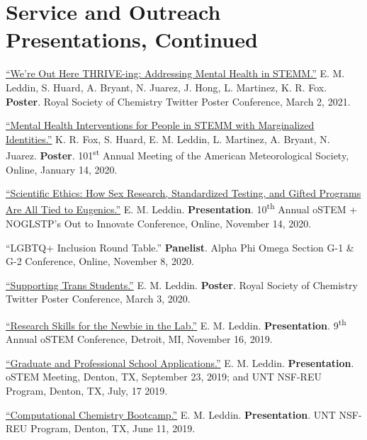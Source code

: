 \documentclass[letterpaper,11pt]{article}
\begin{document}
\section{Service and Outreach Presentations, Continued}
\begin{etaremune}[start=12]

  \item \textnormal{\href{https://twitter.com/ThriveLifeline/status/1366720589130592259?s=20}{``We're Out Here THRIVE-ing: Addressing Mental Health in STEMM.''} E. M. Leddin, S. Huard, A. Bryant, N. Juarez, J. Hong, L. Martinez, K. R. Fox. \textbf{Poster}. Royal Society of Chemistry Twitter Poster Conference, March 2, 2021.}
  \item \textnormal{\href{https://bit.ly/2020-oSTEM-Ethics}{``Mental Health Interventions for People in STEMM with Marginalized Identities.''} K. R. Fox, S. Huard, E. M. Leddin, L. Martinez, A. Bryant, N. Juarez. \textbf{Poster}. 101\textsuperscript{st} Annual Meeting of the American Meteorological Society, Online, January 14, 2020.}
  \item \textnormal{\href{https://bit.ly/2020-oSTEM-Ethics}{``Scientific Ethics: How Sex Research, Standardized Testing, and Gifted Programs Are All Tied to Eugenics.''} E. M. Leddin. \textbf{Presentation}. 10\textsuperscript{th} Annual oSTEM + NOGLSTP's Out to Innovate\texttrademark{} Conference, Online, November 14, 2020.}
  \item \textnormal{``LGBTQ+ Inclusion Round Table.'' \textbf{Panelist}. Alpha Phi Omega Section G-1 \& G-2 Conference, Online, November 8, 2020.}
  \item \textnormal{\href{https://twitter.com/EmLedd1/status/1234812260515749889?s=20}{``Supporting Trans Students.''} E. M. Leddin. \textbf{Poster}. Royal Society of Chemistry Twitter Poster Conference, March 3, 2020.}
  \item \textnormal{\href{http://bit.ly/2019-oSTEM-PROF10}{``Research Skills for the Newbie in the Lab.''} E. M. Leddin. \textbf{Presentation}. 9\textsuperscript{th} Annual oSTEM Conference, Detroit, MI, November 16, 2019.}
\item \textnormal{\href{https://www.youtube.com/watch?v=6VkSUhsZr40&feature=youtu.be}{``Graduate and Professional School Applications.''} E. M. Leddin. \textbf{Presentation}. oSTEM Meeting, Denton, TX, September 23, 2019; and UNT NSF-REU Program, Denton, TX, July, 17 2019.}
  \item \textnormal{\href{http://bit.ly/2019-UNTREU-CCBC}{``Computational Chemistry Bootcamp.''} E. M. Leddin. \textbf{Presentation}. UNT NSF-REU Program, Denton, TX, June 11, 2019.}

\end{etaremune}
\end{document}
